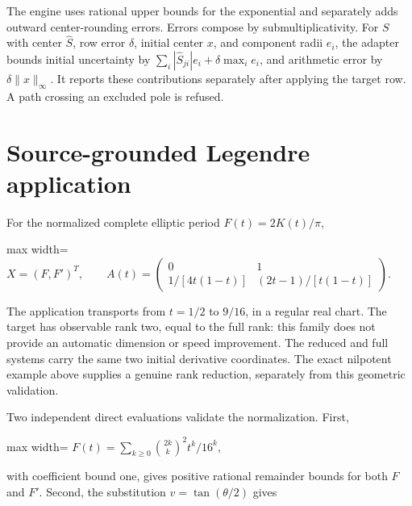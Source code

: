 \documentclass[
  11pt,
  a4paper,
]{report}
\begin{document}
The engine uses rational upper bounds for the exponential and separately
adds outward center-rounding errors. Errors compose by
submultiplicativity. For \(S\) with center \(\widehat S\), row error
\(\delta\), initial center \(x\), and component radii \(e_i\), the
adapter bounds initial uncertainty by
\(\sum_i|\widehat S_{ji}|e_i+\delta\max_i e_i\), and arithmetic error by
\(\delta\|x\|_\infty\). It reports these contributions separately after
applying the target row. A path crossing an excluded pole is refused.

\hypertarget{source-grounded-legendre-application}{%
\section{Source-grounded Legendre
application}\label{source-grounded-legendre-application}}

For the normalized complete elliptic period \(F(t)=2K(t)/\pi\),

\begin{center}
\begin{adjustbox}{max width=\linewidth}
$\displaystyle
X=(F,F')^T,\qquad
A(t)=\begin{pmatrix}0&1\\[2pt]
1/[4t(1-t)]&(2t-1)/[t(1-t)]\end{pmatrix}.
$
\end{adjustbox}
\end{center}

The application transports from \(t=1/2\) to \(9/16\), in a regular real
chart. The target has observable rank two, equal to the full rank: this
family does not provide an automatic dimension or speed improvement. The
reduced and full systems carry the same two initial derivative
coordinates. The exact nilpotent example above supplies a genuine rank
reduction, separately from this geometric validation.

Two independent direct evaluations validate the normalization. First,

\begin{center}
\begin{adjustbox}{max width=\linewidth}
$\displaystyle
F(t)=\sum_{k\ge0}\binom{2k}{k}^2t^k/16^k,
$
\end{adjustbox}
\end{center}

with coefficient bound one, gives positive rational remainder bounds for
both \(F\) and \(F'\). Second, the substitution \(v=\tan(\theta/2)\)
gives
\end{document}
